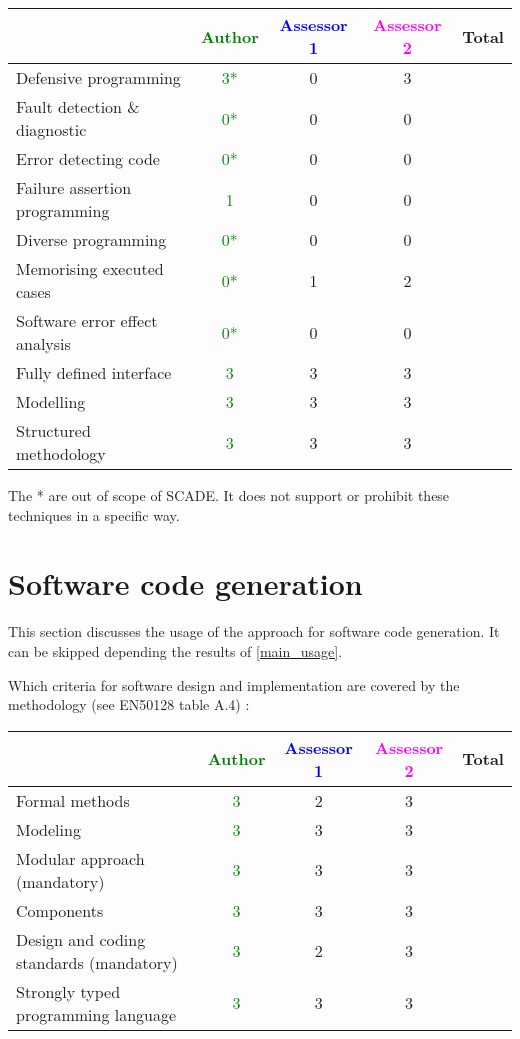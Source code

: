 \begin{tabular}{|l | c | c | c | c|}
\hline
& \textcolor{green}{Author} & \textcolor{blue}{Assessor 1} & \textcolor{magenta}{Assessor 2} & Total \\
\hline
Defensive programming  & \textcolor{green}{3*} & 0 &3 &  \\
\hline 
Fault detection \& diagnostic  & \textcolor{green}{0*} & 0 &0 &  \\
\hline
Error detecting code  & \textcolor{green}{0*} & 0 &0 &  \\
\hline
Failure assertion programming & \textcolor{green}{1} & 0 &0 &  \\
\hline
Diverse programming & \textcolor{green}{0*} & 0 &0 &  \\
\hline
Memorising executed cases & \textcolor{green}{0*} & 1 &2 &  \\
\hline
Software error effect analysis & \textcolor{green}{0*} & 0 &0 &  \\
\hline
Fully defined interface & \textcolor{green}{3} & 3 &3 &  \\
\hline
Modelling  & \textcolor{green}{3} & 3 &3 &  \\
\hline
Structured methodology & \textcolor{green}{3} & 3 &3 &  \\
\hline
\end{tabular}

\begin{author_comment}
The * are out of scope of SCADE. It does not support or prohibit these techniques in a specific way.   
\end{author_comment}


\section{Software code generation}
This section discusses the usage of the approach for software code generation.
It can be skipped depending the results of \ref{main_usage}.

Which criteria for software design and implementation are covered by the methodology
(see EN50128 table A.4) :

\begin{tabular}{|l | c | c | c | c|}
\hline
& \textcolor{green}{Author} & \textcolor{blue}{Assessor 1} & \textcolor{magenta}{Assessor 2} & Total \\
\hline
Formal methods  & \textcolor{green}{3} & 2 &3 &  \\
\hline 
Modeling  & \textcolor{green}{3} & 3 &3 &  \\
\hline
Modular approach (mandatory) & \textcolor{green}{3} & 3 &3 &  \\
\hline
Components & \textcolor{green}{3} & 3 &3 &  \\
\hline
Design and coding standards (mandatory) & \textcolor{green}{3} & 2 &3 &  \\
\hline
Strongly typed programming language & \textcolor{green}{3} & 3 &3 &  \\
\hline



\end{tabular}

